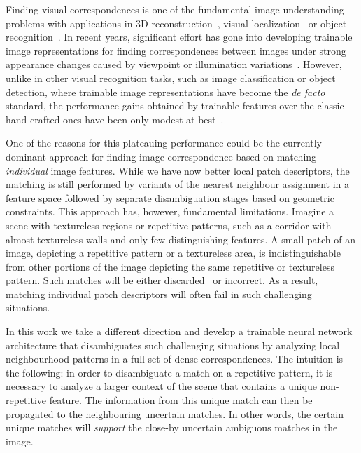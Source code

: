 \documentclass{article}
\begin{document}
Finding visual correspondences is one of the fundamental image understanding problems with applications in 3D reconstruction~\cite{agarwal2011building}, visual localization~\cite{Sattler18,Taira18} or object recognition~\cite{liu2008siftflow}. In recent years, significant effort has gone into developing trainable image representations for finding correspondences between images under strong appearance changes caused by viewpoint or illumination variations~\cite{jahrer2008learned, fischer2014descriptor, zagoruyko2015learning, han2015matchnet, balntas2016pn, ConvOpt,DeepDesc,TFeat,yi2016lift}. However, unlike in other visual recognition tasks, such as image classification or object detection, where trainable image representations have become the \emph{de facto} standard, the performance gains obtained by trainable features over the classic hand-crafted ones have been only modest at best~\cite{Schonberger_2017_CVPR}.

One of the reasons for this plateauing performance could be the currently dominant approach for finding image correspondence based on matching  {\em individual} image features. 
While we have now better local patch descriptors, the matching is still performed by variants of the nearest neighbour assignment in a feature space followed by separate disambiguation stages based on geometric constraints. This approach has, however, fundamental limitations. Imagine a scene with textureless regions or repetitive patterns, such as a corridor with almost textureless walls and only few distinguishing features.
A small patch of an image, depicting a repetitive pattern or a textureless area, is indistinguishable from other portions of the image depicting the same repetitive or textureless pattern. Such matches will be either discarded~\cite{lowe2004distinctive} or incorrect. As a result, matching individual patch descriptors will often fail in such challenging situations. 


In this work we take a different direction and develop a trainable neural network architecture that disambiguates such challenging situations by analyzing local neighbourhood patterns in a full set of dense correspondences. The intuition is the following: in order to disambiguate a match on a repetitive pattern, it is necessary to analyze a larger context of the scene that contains a unique non-repetitive feature. The information from this unique match can then be propagated to the neighbouring uncertain matches. 
In other words, the certain unique matches will \emph{support} the close-by uncertain ambiguous matches in the image.
\end{document}
